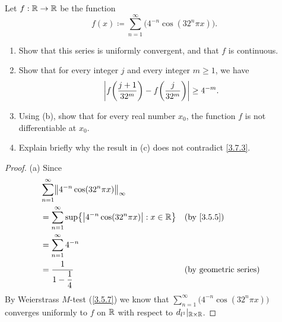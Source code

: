 \begin{ex}\label{ex:4.7.10}
  Let \(f : \mathbb{R} \to \mathbb{R}\) be the function
  \[
    f(x) \coloneqq \sum_{n = 1}^\infty \big(4^{-n} \cos(32^n \pi x)\big).
  \]
  \begin{enumerate}
    \item Show that this series is uniformly convergent, and that \(f\) is continuous.
    \item Show that for every integer \(j\) and every integer \(m \geq 1\), we have
          \[
            \left\lvert f\bigg(\dfrac{j + 1}{32^m}\bigg) - f\bigg(\dfrac{j}{32^m}\bigg)\right\rvert \geq 4^{-m}.
          \]
    \item Using (b), show that for every real number \(x_0\), the function \(f\) is not differentiable at \(x_0\).
    \item Explain briefly why the result in (c) does not contradict \cref{3.7.3}.
  \end{enumerate}
\end{ex}

\begin{proof}{(a)}
  Since
  \begin{align*}
     & \sum_{n = 1}^\infty \norm*{4^{-n} \cos(32^n \pi x)}_{\infty}                                                       \\
     & = \sum_{n = 1}^\infty \sup\set{\abs{4^{-n} \cos(32^n \pi x)} : x \in \R} &  & \by{3.5.5}                   \\
     & = \sum_{n = 1}^\infty 4^{-n}                                                                                       \\
     & = \dfrac{1}{1 - \dfrac{1}{4}}                                                    &  & \text{(by geometric series)}
  \end{align*}
  By Weierstrass \(M\)-test (\cref{3.5.7}) we know that \(\sum_{n = 1}^\infty \big(4^{-n} \cos(32^n \pi x)\big)\) converges uniformly to \(f\) on \(\mathbb{R}\) with respect to \(d_{l^1}|_{\mathbb{R} \times \mathbb{R}}\).
\end{proof}

